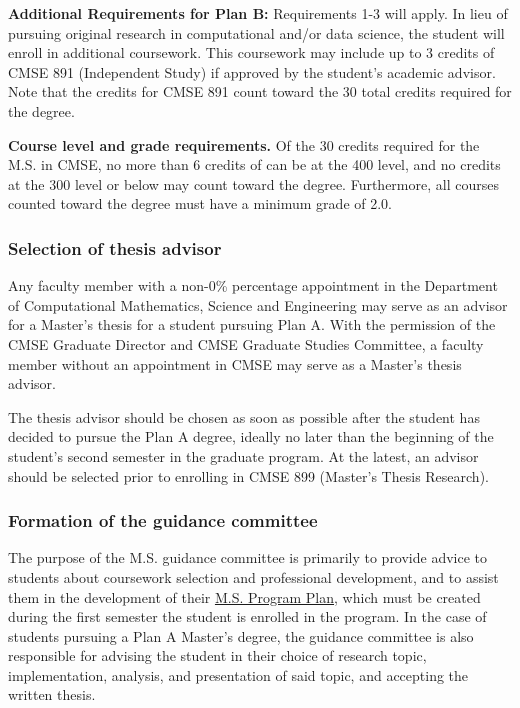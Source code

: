 \vspace{3mm}
\noindent
\textbf{Additional Requirements for Plan B:} Requirements 1-3 will
apply. In lieu of pursuing original research in computational and/or
data science, the student will enroll in additional coursework. This
coursework may include up to 3 credits of CMSE 891 (Independent Study)
if approved by the student's academic advisor.   Note that the credits
for CMSE 891 count
toward the 30 total credits required for the degree.

\vspace{3mm}
\noindent
\textbf{Course level and grade requirements.}  Of the 30 credits
required for the M.S. in CMSE, no more than 6 credits of can be at the
400 level, and no credits at the 300 level or below may count toward
the degree.  Furthermore, all courses counted toward the degree must
have a minimum grade of 2.0.


\subsubsection{Selection of thesis advisor}

Any faculty member with a non-0\% percentage appointment in the
Department of Computational Mathematics, Science and Engineering may
serve as an advisor for a Master's thesis for a student pursuing Plan
A.  With the permission of the CMSE Graduate Director and CMSE
Graduate Studies Committee, a faculty member without an appointment in
CMSE may serve as a Master's thesis advisor.  

The thesis advisor should be
chosen as soon as possible after the student has decided to pursue the
Plan A degree,  ideally no later than the beginning of the student's second
semester in the graduate program.  At the latest, an advisor should be selected prior to
enrolling in CMSE 899 (Master's Thesis Research).  


\subsubsection{Formation of the guidance committee}
\label{sec:ms_guidance_comm}

The purpose of the M.S. guidance committee is primarily to provide
advice to students about coursework selection and professional
development, and to assist them in the development of their
\href{https://www.egr.msu.edu/grs/}{M.S. Program Plan}, which must be
created during the first semester the student is enrolled in the
program.  In the case of students pursuing a Plan A Master's degree,
the guidance committee is also responsible for advising the student in
their choice of research topic, implementation, analysis, and
presentation of said topic, and accepting the written thesis.

